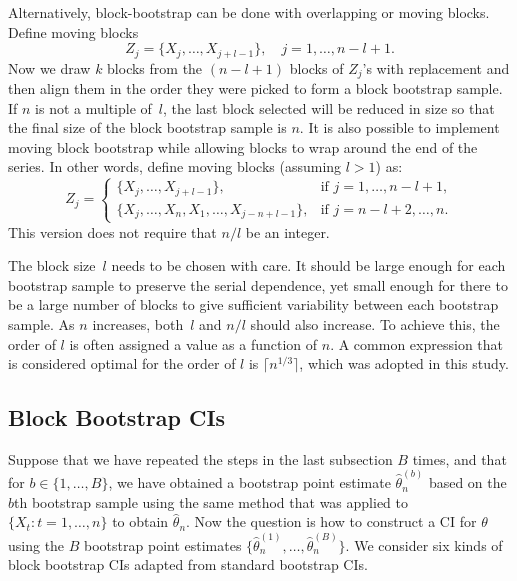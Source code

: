 \documentclass[10pt]{article}
\begin{document}
Alternatively, block-bootstrap can be done with overlapping or moving blocks.
Define moving blocks
\[
Z_j = \{X_j, \ldots, X_{j + l - 1}\}, \quad 
j = 1, \ldots, n - l + 1.
\]
Now we draw $k$ blocks from the $(n - l + 1)$ blocks 
of $Z_j$'s with replacement and then align them in the order they were picked to 
form a block bootstrap sample. If $n$ is not a multiple of~$l$, the last block 
selected will be reduced in size so that the final size of the block bootstrap 
sample is $n$. It is also possible to implement moving block bootstrap while 
allowing blocks to wrap around the end of the series. In other words, define 
moving blocks (assuming $l > 1$) as:
\begin{equation*}
Z_j =
    \begin{cases}
        \{X_j, \ldots, X_{j + l - 1}\}, & \text{if } j = 1, \dots, n - l + 1,\\
        \{X_j, \ldots, X_n, X_1, \ldots, X_{j-n+l-1}\}, & \text{if } j = n - l
        + 2 ,\dots, n.
    \end{cases}
\end{equation*}
This version does not require that $n/l$ be an integer.


The block size~$l$ needs to be chosen with care. It should be large enough for
each bootstrap sample to preserve the serial dependence, yet small enough for
there to be a large number of blocks to give sufficient variability between each 
bootstrap sample. As $n$ increases, both~$l$ and $n / l$ should also increase. 
To achieve this, the order of $l$ is often assigned a value as a function of 
$n$. A common 
expression that is considered optimal for the order of $l$ is 
$\lceil n^{1/3} \rceil$,
\citep{buhlmann1999block} 
which was adopted in this study.

\subsection*{Block Bootstrap CIs}

Suppose that we have repeated the steps in the last subsection $B$ times, and
that for $b \in \{1, \ldots, B\}$, we have obtained a bootstrap point estimate
$\hat\theta_n^{(b)}$ based on the $b$th bootstrap sample using the same method
that was applied to $\{X_t: t = 1, \ldots, n\}$ to obtain $\hat\theta_n$. Now
the question is how to construct a CI for $\theta$ using the $B$ bootstrap point 
estimates $\{\hat\theta_n^{(1)}, \ldots, \hat\theta_n^{(B)}\}$. We consider six 
kinds of block bootstrap CIs adapted from standard bootstrap CIs.
\end{document}

